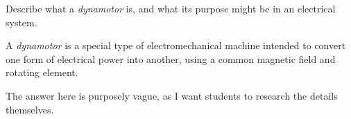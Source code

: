 

Describe what a {\it dynamotor} is, and what its purpose might be in an electrical system.







A {\it dynamotor} is a special type of electromechanical machine intended to convert one form of electrical power into another, using a common magnetic field and rotating element.







The answer here is purposely vague, as I want students to research the details themselves.




